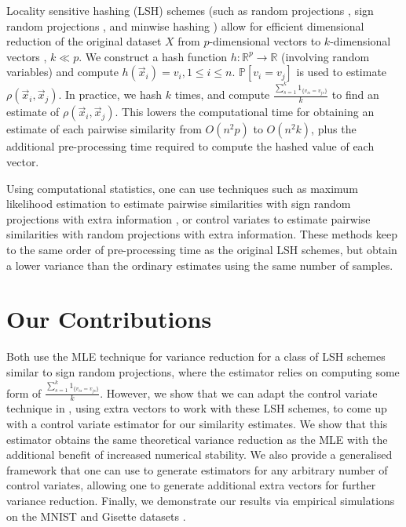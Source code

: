 \documentclass[runningheads]{llncs}
\begin{document}
    Locality sensitive hashing (LSH) schemes (such as random projections \cite{Achlioptas:2003:DRP:861182.861189,Indyk:1998:ANN:276698.276876}, sign random projections \cite{charikar2002similarity}, and minwise hashing \cite{broder1997resemblance}) allow for efficient dimensional reduction of the original dataset $X$ from $p$-dimensional vectors to $k$-dimensional vectors \cite{slaney2008locality}, $k \ll p$. We construct a hash function $h: \mathbb R^p \rightarrow \mathbb R$ (involving random variables) and compute $h(\vec{x}_i) = v_i, 1 \leq i\leq n$. $\mathbb P[v_i = v_j]$ is used to estimate $\rho(\vec{x}_i, \vec{x}_j)$. In practice, we hash $k$ times, and compute $\frac{\sum_{s=1}^k 1_{\{v_{is} = v_{js}\}}}{k}$ to find an estimate of $\rho(\vec{x}_i, \vec{x}_j)$. This lowers the computational time for obtaining an estimate of each pairwise similarity from $O(n^2p)$ to $O(n^2k)$, plus the additional pre-processing time required to compute the hashed value of each vector.
    
Using computational statistics, one can use techniques such as maximum likelihood estimation \cite{li2006improving} to estimate pairwise similarities with sign random projections with extra information \cite{kang2018improving}, or control variates to estimate pairwise similarities with random projections \cite{Kang2017,Kang2021-correlations} with extra information. These methods keep to the same order of pre-processing time as the original LSH schemes, but obtain a lower variance than the ordinary estimates using the same number of samples.
        
\section{Our Contributions}

Both \cite{kang2018improving,li2006improving} use the MLE technique for variance reduction for a class of LSH schemes similar to sign random projections, where the estimator relies on computing some form of $\frac{\sum_{s=1}^k 1_{\{v_{is} = v_{js} \}}}{k}$. However, we show that we can adapt the control variate technique in \cite{Kang2017,Kang2021-correlations}, using extra vectors to work with these LSH schemes, to come up with a control variate estimator for our similarity estimates. We show that this estimator obtains the same theoretical variance reduction as the MLE with the additional benefit of increased numerical stability. We also provide a generalised framework that one can use to generate estimators for any arbitrary number of control variates, allowing one to generate additional extra vectors for further variance reduction. Finally, we demonstrate our results via empirical simulations on the MNIST \cite{lecun1998gradient} and Gisette datasets \cite{NIPS2004_2728,Lichman:2013}.
    
\end{document}
